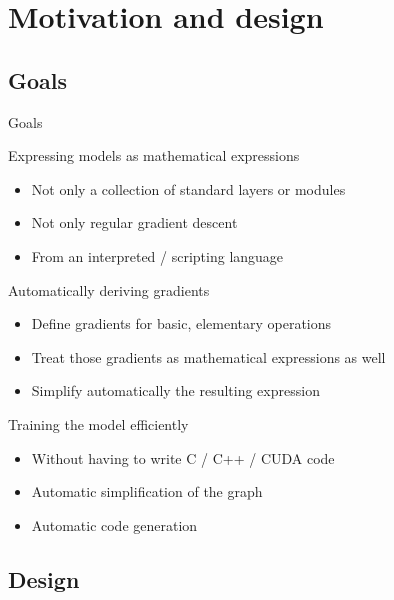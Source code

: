 \documentclass[a4paper,9pt]{beamer}
\begin{document}
\section{Motivation and design}
\begin{frame}
  \tableofcontents[currentsection]
\end{frame}

\subsection{Goals}

\begin{frame}{Goals}

  \begin{block}{Expressing models as mathematical expressions}
  \begin{itemize}
    \item Not only a collection of standard layers or modules
    \item Not only regular gradient descent
    \item From an interpreted / scripting language
  \end{itemize}
  \end{block}

  \begin{block}{Automatically deriving gradients}
  \begin{itemize}
    \item Define gradients for basic, elementary operations
    \item Treat those gradients as mathematical expressions as well
    \item Simplify automatically the resulting expression
  \end{itemize}
  \end{block}

  \begin{block}{Training the model efficiently}
  \begin{itemize}
    \item Without having to write C / C++ / CUDA code
    \item Automatic simplification of the graph
    \item Automatic code generation
  \end{itemize}
  \end{block}

\end{frame}

\subsection{Design}
\end{document}
